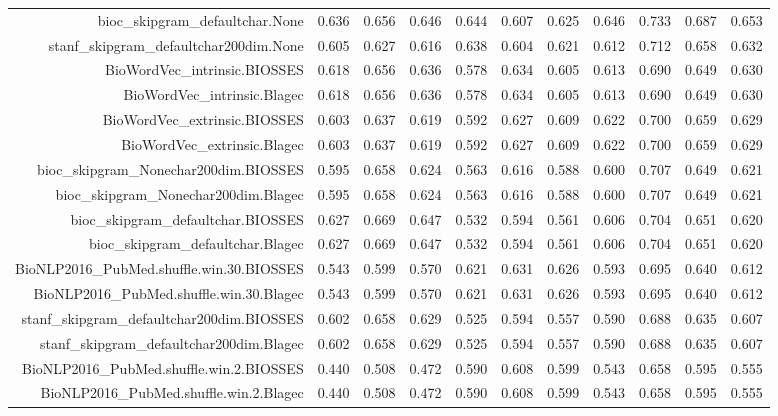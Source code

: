 \begin{table}[!h]
\begin{tabular}{rrrrrrrrrrr}
  bioc\_skipgram\_defaultchar.None & 0.636 & 0.656 & 0.646 & 0.644 & 0.607 & 0.625 & 0.646 & 0.733 & 0.687 & 0.653 \\ 
  stanf\_skipgram\_defaultchar200dim.None & 0.605 & 0.627 & 0.616 & 0.638 & 0.604 & 0.621 & 0.612 & 0.712 & 0.658 & 0.632 \\ 
  BioWordVec\_intrinsic.BIOSSES & 0.618 & 0.656 & 0.636 & 0.578 & 0.634 & 0.605 & 0.613 & 0.690 & 0.649 & 0.630 \\ 
  BioWordVec\_intrinsic.Blagec & 0.618 & 0.656 & 0.636 & 0.578 & 0.634 & 0.605 & 0.613 & 0.690 & 0.649 & 0.630 \\ 
  BioWordVec\_extrinsic.BIOSSES & 0.603 & 0.637 & 0.619 & 0.592 & 0.627 & 0.609 & 0.622 & 0.700 & 0.659 & 0.629 \\ 
  BioWordVec\_extrinsic.Blagec & 0.603 & 0.637 & 0.619 & 0.592 & 0.627 & 0.609 & 0.622 & 0.700 & 0.659 & 0.629 \\ 
  bioc\_skipgram\_Nonechar200dim.BIOSSES & 0.595 & 0.658 & 0.624 & 0.563 & 0.616 & 0.588 & 0.600 & 0.707 & 0.649 & 0.621 \\ 
  bioc\_skipgram\_Nonechar200dim.Blagec & 0.595 & 0.658 & 0.624 & 0.563 & 0.616 & 0.588 & 0.600 & 0.707 & 0.649 & 0.621 \\ 
  bioc\_skipgram\_defaultchar.BIOSSES & 0.627 & 0.669 & 0.647 & 0.532 & 0.594 & 0.561 & 0.606 & 0.704 & 0.651 & 0.620 \\ 
  bioc\_skipgram\_defaultchar.Blagec & 0.627 & 0.669 & 0.647 & 0.532 & 0.594 & 0.561 & 0.606 & 0.704 & 0.651 & 0.620 \\ 
  BioNLP2016\_PubMed.shuffle.win.30.BIOSSES & 0.543 & 0.599 & 0.570 & 0.621 & 0.631 & 0.626 & 0.593 & 0.695 & 0.640 & 0.612 \\ 
  BioNLP2016\_PubMed.shuffle.win.30.Blagec & 0.543 & 0.599 & 0.570 & 0.621 & 0.631 & 0.626 & 0.593 & 0.695 & 0.640 & 0.612 \\ 
  stanf\_skipgram\_defaultchar200dim.BIOSSES & 0.602 & 0.658 & 0.629 & 0.525 & 0.594 & 0.557 & 0.590 & 0.688 & 0.635 & 0.607 \\ 
  stanf\_skipgram\_defaultchar200dim.Blagec & 0.602 & 0.658 & 0.629 & 0.525 & 0.594 & 0.557 & 0.590 & 0.688 & 0.635 & 0.607 \\ 
  BioNLP2016\_PubMed.shuffle.win.2.BIOSSES & 0.440 & 0.508 & 0.472 & 0.590 & 0.608 & 0.599 & 0.543 & 0.658 & 0.595 & 0.555 \\ 
  BioNLP2016\_PubMed.shuffle.win.2.Blagec & 0.440 & 0.508 & 0.472 & 0.590 & 0.608 & 0.599 & 0.543 & 0.658 & 0.595 & 0.555 \\ 
   \hline
\end{tabular}
\endgroup
\end{table}

